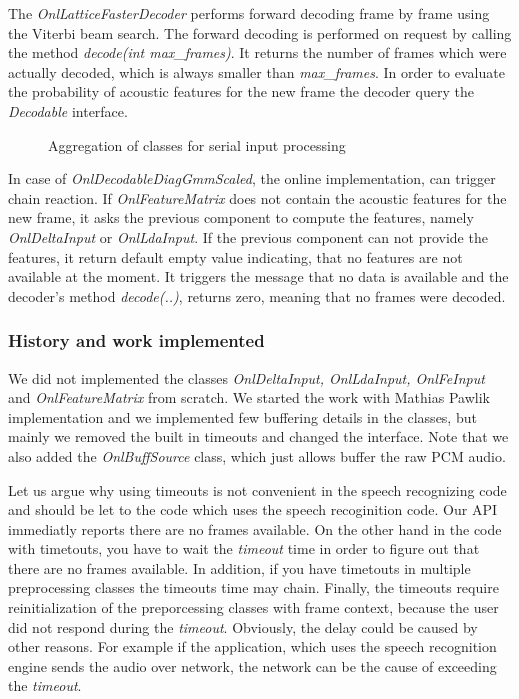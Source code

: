 The {\it OnlLatticeFasterDecoder}\/ performs forward decoding frame by frame using the Viterbi beam search.
The forward decoding is performed on request by calling the method {\it decode(int max\_frames)}.
It returns the number of frames which were actually decoded, which is always smaller than {\it max\_frames}.
In order to evaluate the probability of acoustic features for the new frame
the decoder query the {\it Decodable}\/ interface.

\begin{figure}[!htp]
    \begin{center}
        
    \caption{Aggregation of classes for serial input processing}
    \label{fig:classes} 
    \end{center}
\end{figure}

In case of {\it OnlDecodableDiagGmmScaled}, the online implementation, can trigger chain reaction.
If {\it OnlFeatureMatrix}\/ does not contain the acoustic features for the new frame, it asks
the previous component to compute the features, namely {\it OnlDeltaInput}\/ or {\it OnlLdaInput}\/.
If the previous component can not provide the features, it return default empty value indicating,
that no features are not available at the moment. It triggers the message that no data is available
and the decoder's method {\it decode(..)}, returns zero, meaning that no frames were decoded.

\subsubsection{History and work implemented}
\label{ssub:history}
We did not implemented the classes {\it OnlDeltaInput, OnlLdaInput, OnlFeInput}\/ and {\it OnlFeatureMatrix}\/
from scratch. We started the work with Mathias Pawlik implementation and we implemented few buffering details
in the classes, but mainly we removed the built in timeouts and changed the interface.
Note that we also added the {\it OnlBuffSource}\/ class, which just allows buffer the raw \ac{PCM} audio.

Let us argue why using timeouts is not convenient in the speech recognizing code
and should be let to the code which uses the speech recoginition code.
Our \ac{API} immediatly reports there are no frames available.
On the other hand in the code with timetouts, you have to wait the {\it timeout}\/ time
in order to figure out that there are no frames available.
In addition, if you have timetouts in multiple preprocessing classes the timeouts time may chain.
Finally, the timeouts require reinitialization of the preporcessing classes with frame context,
because the user did not respond during the {\it timeout}\/. 
Obviously, the delay could be caused by other reasons. For example if the application, 
which uses the speech recognition engine sends the audio over network, the network can be
the cause of exceeding the {\it timeout}\/.

